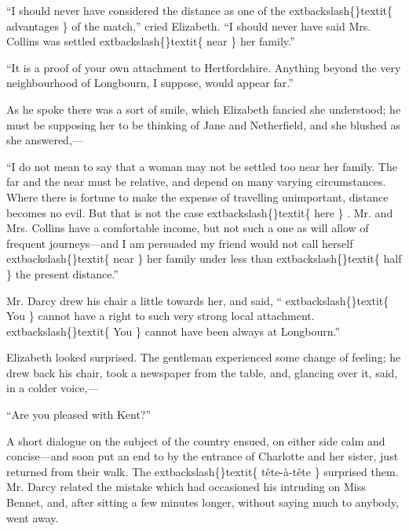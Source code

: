 \documentclass[10pt]{book}
\begin{document}
   “I should never have considered the distance as one of
   the
   	extbackslash\{\}textit\{
    advantages
   \}
   of the match,” cried Elizabeth. “I should never have said Mrs. Collins
was settled
   	extbackslash\{\}textit\{
    near
   \}
   her family.”
  

   “It is a proof of your own attachment to Hertfordshire. Anything beyond
the very neighbourhood of Longbourn, I suppose, would appear far.”
  

   As he spoke there was a sort of smile, which Elizabeth fancied she
understood; he must be supposing her to be thinking of Jane and
Netherfield, and she blushed as she answered,—
  

   “I do not mean to say that a woman may not be settled too near her
family. The far and the near must be relative, and depend on many
varying circumstances. Where there is fortune to make the expense of
travelling unimportant, distance becomes no evil. But that is not the
case
   	extbackslash\{\}textit\{
    here
   \}
   . Mr. and Mrs. Collins have a comfortable income, but not
such a one as will allow of frequent journeys—and I am persuaded my
friend would not call herself
   	extbackslash\{\}textit\{
    near
   \}
   her family under less than
   	extbackslash\{\}textit\{
    half
   \}
   the present distance.”
  

   Mr. Darcy drew his chair a little towards her, and said, “
   	extbackslash\{\}textit\{
    You
   \}
   cannot
have a right to such very strong local attachment.
   	extbackslash\{\}textit\{
    You
   \}
   cannot have
been always at Longbourn.”
  

   Elizabeth looked surprised. The gentleman experienced some change of
feeling; he drew back his chair, took a newspaper from the table, and,
glancing over it, said, in a colder voice,—
  

   “Are you pleased with Kent?”
  

   A short dialogue on the subject of the country ensued, on either side
calm and concise—and soon put an end to by the entrance of Charlotte
and her sister, just returned from their walk. The
   	extbackslash\{\}textit\{
    tête-à-tête
   \}
   surprised them. Mr.
   Darcy related the mistake which had occasioned his
intruding on Miss Bennet, and, after sitting a few minutes longer,
without saying much to anybody, went away.
  
\end{document}
